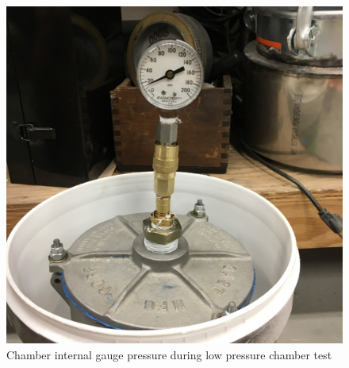 \begin{figure}[h]
\centering
\includegraphics[width=1.0\columnwidth]{./img/aquaPod-test-two-pressureCheck.JPG}
\caption{Chamber internal gauge pressure during low pressure chamber test}
\label{fig:test two pressure check}
\end{figure}
